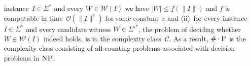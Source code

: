\documentclass{article}
\newcommand{\bigO}[1]{\ensuremath{{\mathcal O}(#1)}}
\newcommand{\CCard}[1]{\|#1\|}
\newcommand{\Card}[1]{\left|#1\right|}
\renewcommand{\P}{\ensuremath{\textsc{P}}\xspace}
\newcommand{\NP}{\ensuremath{\textsc{NP}}\xspace}
\newcommand{\WWW}{\ensuremath{\mathcal{W}}}%
\newcommand{\mtext}[1]{\ensuremath{\mathcal{#1}}}
\newcommand{\cnt}[0]{\ensuremath{\#}}
\newcommand{\cntc}[0]{\ensuremath{\cnt\cdot}}
\begin{document}
instance~$I \in \Sigma^*$ and every $W \in \WWW(I)$ we have
$\Card{W} \leq f(\CCard{I})$ and $f$ is computable in
time~$\bigO{\CCard{I}^c}$ for some constant~$c$ and (ii)~for every
instance~$I \in \Sigma^*$  and every candidate witness $W \in {\Sigma'}^*$, the problem of deciding whether~$W\in\WWW(I)$ indeed holds, is in the complexity class~$\mtext{C}$.
As a result, $\cntc\P$ is the complexity class consisting of all counting
problems associated with decision problems in \NP.
%
%
\end{document}

